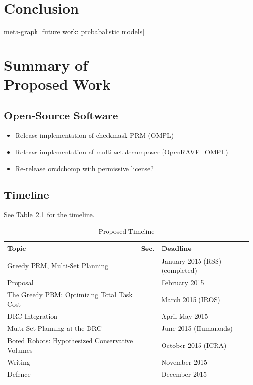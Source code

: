 \documentclass{report}
\begin{document}
\newpage
\chapter{Conclusion}

meta-graph [future work: probabalistic models]


\newpage
\chapter[Summary of Proposed Work]{Summary of\\Proposed Work}

\section{Open-Source Software}

\begin{itemize}
\item Release implementation of checkmask PRM (OMPL)
\item Release implementation of multi-set decomposer (OpenRAVE+OMPL)
\item Re-release orcdchomp with permissive license?
\end{itemize}

\section{Timeline}

See Table~\ref{table:timeline} for the timeline.

\begin{table}
\centering
\begin{tabular}{lll}
\hline
Topic & Sec. & Deadline \\
\hline
Greedy PRM, Multi-Set Planning & & January 2015 (RSS) (completed) \\
Proposal & & February 2015 \\
The Greedy PRM: Optimizing Total Task Cost & & March 2015 (IROS) \\
DRC Integration & & April-May 2015 \\
Multi-Set Planning at the DRC & & June 2015 (Humanoids) \\
Bored Robots: Hypothesized Conservative Volumes & & October 2015 (ICRA) \\
Writing & & November 2015 \\
Defence & & December 2015 \\
\hline
\end{tabular}
\caption{Proposed Timeline}
\label{table:timeline}
\end{table}
\end{document}
